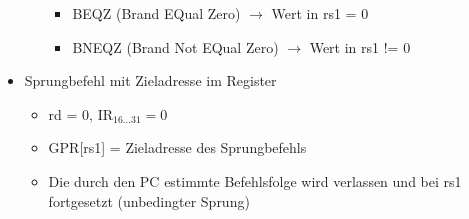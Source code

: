 \begin{itemize}
\begin{itemize}
		\begin{itemize}
			\item BEQZ (Brand EQual Zero) $\to$ Wert in rs1 = 0
			\item BNEQZ (Brand Not EQual Zero) $\to$ Wert in rs1 != 0
		\end{itemize}
	\end{itemize}
	\item Sprungbefehl mit Zieladresse im Register
	\begin{itemize}
		\item rd = 0, IR$_{16 \ldots 31} = 0$
		\item GPR[rs1] = Zieladresse des Sprungbefehls
		\item Die durch den PC estimmte Befehlsfolge wird verlassen und bei rs1 fortgesetzt (unbedingter Sprung)
	\end{itemize}
\end{itemize}
